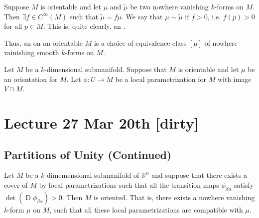 \documentclass[notoc,notitlepage]{tufte-book}
\DeclareMathOperator{\D}{D}
\begin{document}
\begin{note}
  Suppose $M$ is orientable and let $\mu$ and $\tilde{\mu}$ be two nowhere
  vanishing $k$-forms on $M$. Then $\exists f \in C^\infty(M)$ such that
  $\tilde{\mu} = f \mu$. We say that $\mu \sim \tilde{\mu}$ if $f > 0$, i.e.
  $f(p) > 0$ for all $p \in M$. This is, quite clearly, an .

  Thus, an  on an orientable $M$ is a choice of equivalence
  class $[\mu]$ of nowhere vainishing smooth $k$-forms on $M$.
\end{note}

\begin{eg}
\end{eg}

\begin{defn}\label{defn:compatible_orientation}
  Let $M$ be a $k$-dimensional submanifold. Suppose that $M$ is orientable and
  let $\mu$ be an orientation for $M$. Let $\phi : U \to M$ be a local
  parametrization for $M$ with image $V \cap M$.
\end{defn}



\chapter{Lecture 27 Mar 20th [dirty]}%
\label{chp:lecture_27_mar_20th}

\section{Partitions of Unity (Continued)}%
\label{sec:partitions_of_unity_continued}

\begin{propo}
  Let $M$ be a $k$-dimemensional submanifold of $\mathbb{R}^n$ and suppose that
  there exists a cover of $M$ by local parametrizations such that all the
  transition maps $\phi_{\beta \alpha}$ satisfy $\det (\D \phi_{ \beta \alpha }) >
  0$. Then $M$ is oriented. That is, there exists a nowhere vanishing $k$-form
  $\mu$ on $M$, such that all these local parametrizations are compatible with
  $\mu$.
\end{propo}
\end{document}
